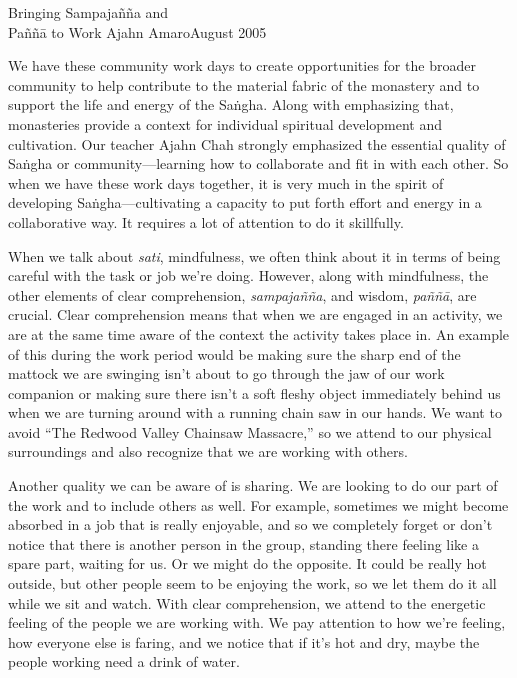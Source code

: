 {Bringing Sampajañña and\\Paññā to Work}
{Ajahn Amaro}{August 2005}

We have these community work days to create opportunities for the 
broader community to help contribute to the material fabric of the 
monastery and to support the life and energy of the Saṅgha. Along 
with emphasizing that, monasteries provide a context for individual 
spiritual development and cultivation. Our teacher Ajahn Chah strongly 
emphasized the essential quality of Saṅgha or community---learning 
how to collaborate and fit in with each other. So when we have these 
work days together, it is very much in the spirit of developing 
Saṅgha---cultivating a capacity to put forth effort and energy in a 
collaborative way. It requires a lot of attention to do it skillfully.

When we talk about \emph{sati}, mindfulness, we often think about it in
terms of being careful with the task or job we're doing. However, along
with mindfulness, the other elements of clear comprehension,
\emph{sampajañña}, and wisdom, \emph{paññā}, are crucial. Clear
comprehension means that when we are engaged in an activity, we are at
the same time aware of the context the activity takes place in. An
example of this during the work period would be making sure the sharp
end of the mattock we are swinging isn't about to go through the jaw of
our work companion or making sure there isn't a soft fleshy object
\mbox{immediately} behind us when we are turning around with a running
chain saw in our hands. We want to avoid ``The Redwood Valley Chainsaw
Massacre,'' so we attend to our physical surroundings and also recognize
that we are working with others.

Another quality we can be aware of is sharing. We are looking to do our 
part of the work and to include others as well. For example, sometimes 
we might become absorbed in a job that is really enjoyable, and so we 
completely forget or don't notice that there is another person in the 
group, standing there feeling like a spare part, waiting for us. Or we 
might do the opposite. It could be really hot outside, but other people 
seem to be enjoying the work, so we let them do it all while we sit and 
watch. With clear comprehension, we attend to the energetic feeling of 
the people we are working with. We pay attention to how we're feeling, 
how everyone else is faring, and we notice that if it's hot and dry, 
maybe the people working need a drink of water.

